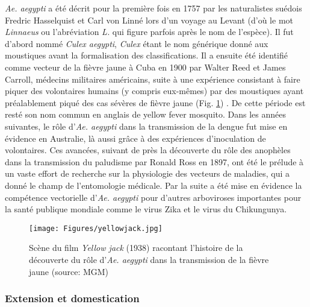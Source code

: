 {\em Ae. aegypti} a été décrit pour la première fois en 1757 par les naturalistes suédois Fredric Hasselquist et Carl von Linné lors d'un voyage au Levant \cite{iterpalestinum1757} (d'où le mot {\em Linnaeus} ou l'abréviation {\em L.} qui figure parfois après le nom de l'espèce). Il fut d'abord nommé {\em Culex aegypti}, {\em Culex} étant le nom générique donné aux moustiques avant la formalisation des classifications.
Il a ensuite été identifié comme vecteur de la fièvre jaune à Cuba en 1900 par Walter Reed et James Carroll, médecins militaires américains, suite à une expérience consistant à faire piquer des volontaires humains (y compris eux-mêmes) par des moustiques ayant préalablement piqué des cas sévères de fièvre jaune (Fig. \ref{fig:yellowjack}) \cite{tabachnick1991evolutionary}.
De cette période est resté son nom commun en anglais de \guillemotleft yellow fever mosquito\guillemotright \;.
Dans les années suivantes, le rôle d'{\em Ae. aegypti} dans la transmission de la dengue fut mise en évidence en Australie, là aussi grâce à des expériences d'inoculation de volontaires.
Ces avancées, suivant de près la découverte du rôle des anophèles dans la transmission du paludisme par Ronald Ross en 1897, ont été le prélude à un vaste effort de recherche sur la physiologie des vecteurs de maladies, qui a donné le champ de l'entomologie médicale.
Par la suite a été mise en évidence la compétence vectorielle d'{\em Ae. aegypti} pour d'autres arboviroses importantes pour la santé publique mondiale comme le virus Zika et le virus du Chikungunya.

\begin{figure}[h]
	\centering
	\texttt{[image: Figures/yellowjack.jpg]}
	\caption{Scène du film {\em Yellow jack} (1938) racontant l'histoire de la découverte du rôle d'{\em Ae. aegypti} dans la transmission de la fièvre jaune (source: MGM)}
	\label{fig:yellowjack}
\end{figure}



\subsubsection{Extension et domestication}

